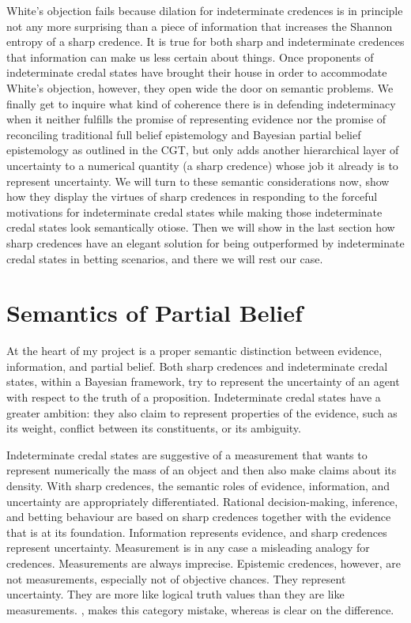 White's objection fails because dilation for
indeterminate credences is in principle not any more
surprising than a piece of information that increases
the Shannon entropy of a sharp credence. It is true for
both sharp and indeterminate credences that information
can make us less certain about things. Once proponents
of indeterminate credal states have brought their house
in order to accommodate White's objection, however,
they open wide the door on semantic problems. We
finally get to inquire what kind of coherence there is
in defending indeterminacy when it neither fulfills the
promise of representing evidence nor the promise of
reconciling traditional full belief 
epistemology and Bayesian partial belief epistemology
as outlined in the CGT, but only adds another
hierarchical layer of uncertainty to a numerical
quantity (a sharp credence) whose job it already is to
represent uncertainty. We will turn to these semantic
considerations now, show how they display the virtues
of sharp credences in responding to the forceful
motivations for indeterminate credal states while
making those indeterminate credal states look
semantically otiose. Then we will show in the last
section how sharp credences have an elegant solution
for being outperformed by indeterminate credal states
in betting scenarios, and there we will rest our case.

\section{Semantics of Partial Belief}
\label{SemanticsOfPartialBelief}

At the heart of my project is a proper semantic
distinction between evidence, information, and partial
belief. Both sharp credences and indeterminate credal
states, within a Bayesian framework, try to represent
the uncertainty of an agent with respect to the truth
of a proposition. Indeterminate credal states have a
greater ambition: they also claim to represent
properties of the evidence, such as its weight,
conflict between its constituents, or its ambiguity.

Indeterminate credal states are suggestive of a
measurement that wants to represent numerically the
mass of an object and then also make claims about its
density. With sharp credences, the semantic roles of
evidence, information, and uncertainty are
appropriately differentiated. Rational decision-making,
inference, and betting behaviour are based on sharp
credences together with the evidence that is at its
foundation. Information represents evidence, and sharp
credences represent uncertainty. Measurement is in any
case a misleading analogy for credences. Measurements
are always imprecise. Epistemic credences, however, are
not measurements, especially not of objective chances.
They represent uncertainty. They are more like logical
truth values than they are like measurements.
, makes this category mistake,
whereas  is clear on the
difference.


